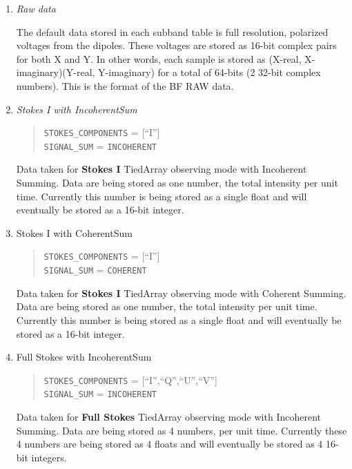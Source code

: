\documentclass[a4paper,10pt,bibtotoc]{scrartcl}
\begin{document}
\begin{enumerate}

\item \textsl{Raw data}

The default data stored in each subband table is full resolution, polarized voltages
from the dipoles. These voltages are stored as 16-bit complex pairs for both X and
Y. In other words, each sample is stored as (X-real, X-imaginary)(Y-real,
Y-imaginary) for a total of 64-bits (2 32-bit complex numbers).  This is the format
of the BF RAW data. 

\item \textsl{Stokes I with IncoherentSum}

  \begin{verse} \small
    \verb|STOKES_COMPONENTS| = [``I''] \\
    \verb|SIGNAL_SUM| = \verb|INCOHERENT|
  \end{verse}

  Data taken for \textbf{Stokes I} TiedArray observing mode with Incoherent
  Summing. Data are being stored as one number, the total intensity per unit
  time. Currently this number is being stored as a single float and will
  eventually be stored as a 16-bit integer.

\item{Stokes I with CoherentSum}
  
  \begin{verse} \small
    \verb|STOKES_COMPONENTS| = [``I''] \\
    \verb|SIGNAL_SUM| = \verb|COHERENT|
  \end{verse}

  Data taken for \textbf{Stokes I} TiedArray observing mode with Coherent
  Summing. Data are being stored as one number, the total intensity per unit
  time.  Currently this number is being stored as a single float and will
  eventually be stored as a 16-bit integer.  
  
\item{Full Stokes with IncoherentSum}
  
  \begin{verse} \small
    \verb|STOKES_COMPONENTS| = [``I'',``Q'',``U'',``V''] \\
    \verb|SIGNAL_SUM| = \verb|INCOHERENT|
  \end{verse}

  Data taken for \textbf{Full Stokes} TiedArray observing mode with Incoherent
  Summing. Data are being stored as 4 numbers, per unit time.  Currently these
  4 numbers are being stored as 4 floats and will eventually be stored as 4
  16-bit integers.
  

\end{enumerate}
\end{document}
